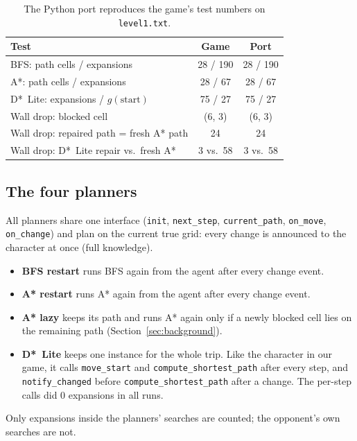 \documentclass[conference,12pt]{IEEEtran}
\newcommand{\dstar}{D*~Lite}
\begin{document}
\begin{table}[!t]
\centering
\footnotesize
\caption{The Python port reproduces the game's test numbers on \texttt{level1.txt}.}
\label{tab:port}
\begin{tabular}{lcc}
\toprule
Test & Game & Port \\
\midrule
BFS: path cells / expansions & 28 / 190 & 28 / 190 \\
A*: path cells / expansions & 28 / 67 & 28 / 67 \\
\dstar{}: expansions / $g(\text{start})$ & 75 / 27 & 75 / 27 \\
Wall drop: blocked cell & (6, 3) & (6, 3) \\
Wall drop: repaired path = fresh A* path & 24 & 24 \\
Wall drop: \dstar{} repair vs.\ fresh A* & 3 vs.\ 58 & 3 vs.\ 58 \\
\bottomrule
\end{tabular}
\end{table}

\subsection{The four planners}
All planners share one interface (\texttt{init}, \texttt{next\_step}, \texttt{current\_path},
\texttt{on\_move}, \texttt{on\_change}) and plan on the current true grid: every change is
announced to the character at once (full knowledge).
\begin{itemize}
\item \textbf{BFS restart} runs BFS again from the agent after every change event.
\item \textbf{A* restart} runs A* again from the agent after every change event.
\item \textbf{A* lazy} keeps its path and runs A* again only if a newly blocked cell lies on the
      remaining path (Section~\ref{sec:background}).
\item \textbf{\dstar{}} keeps one instance for the whole trip. Like the character in our game, it
      calls \texttt{move\_start} and \texttt{compute\_shortest\_path} after every step, and
      \texttt{notify\_changed} before \texttt{compute\_shortest\_path} after a change. The
      per-step calls did 0 expansions in all runs.
\end{itemize}
Only expansions inside the planners' searches are counted; the opponent's own searches are not.
\end{document}
